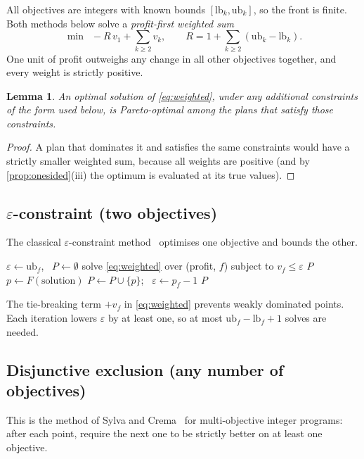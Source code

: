 \documentclass[10pt,a4paper]{article}
\theoremstyle{plain}
\newtheorem{lemma}[proposition]{Lemma}
\theoremstyle{definition}
\theoremstyle{remark}
\begin{document}
All objectives are integers with known bounds $[\mathrm{lb}_k,\mathrm{ub}_k]$, so the front is finite.
Both methods below solve a \emph{profit-first weighted sum}
\begin{equation}
\min\ \; -R\,v_1+\sum_{k\ge2} v_k, \qquad R = 1+\sum_{k\ge 2}(\mathrm{ub}_k-\mathrm{lb}_k).
\label{eq:weighted}
\end{equation}
One unit of profit outweighs any change in all other objectives together, and every weight is
strictly positive.

\begin{lemma}\label{lem:ws}
An optimal solution of \eqref{eq:weighted}, under any additional constraints of the form used below,
is Pareto-optimal among the plans that satisfy those constraints.
\end{lemma}
\begin{proof}
A plan that dominates it and satisfies the same constraints would have a strictly smaller weighted
sum, because all weights are positive (and by \cref{prop:onesided}(iii) the optimum is evaluated at
its true values).
\end{proof}

\subsection{\texorpdfstring{$\varepsilon$}{Epsilon}-constraint (two objectives)}
The classical $\varepsilon$-constraint method~\cite{haimes,ehrgott} optimises one objective and
bounds the other.

\begin{algorithm}[H]
\caption{$\varepsilon$-constraint for (profit, $f$)}\label{alg:eps}
\begin{algorithmic}[1]
\State $\varepsilon\gets\mathrm{ub}_f$, \ $P\gets\emptyset$
\Loop
  \State solve \eqref{eq:weighted} over (profit, $f$) subject to $v_f\le\varepsilon$
   \Return $P$ \EndIf
  \State $p\gets F(\text{solution})$ 
  \State $P\gets P\cup\{p\}$; \ $\varepsilon\gets p_f-1$
   \Return $P$ \EndIf
\EndLoop
\end{algorithmic}
\end{algorithm}

The tie-breaking term $+v_f$ in \eqref{eq:weighted} prevents weakly dominated points. Each iteration
lowers $\varepsilon$ by at least one, so at most $\mathrm{ub}_f-\mathrm{lb}_f+1$ solves are needed.

\subsection{Disjunctive exclusion (any number of objectives)}
This is the method of Sylva and Crema~\cite{sylva} for multi-objective integer programs: after each
point, require the next one to be strictly better on at least one objective.
\end{document}
